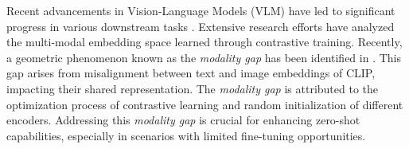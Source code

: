 Recent advancements \cite{clip,align,glip,blip,glip2} in Vision-Language Models (VLM) have led to significant progress in various downstream tasks \cite{styleclip,maskclip,pointclip,denclip,calip,hoiclip}. Extensive research efforts \cite{Wang2020UnderstandingCR,Wang2020UnderstandingTB,clipbagofwords,MindGap} have analyzed the multi-modal embedding space learned through contrastive training. Recently, a geometric phenomenon known as the \textit{modality gap} has been identified in \cite{MindGap}. This gap arises from misalignment between text and image embeddings of CLIP, impacting their shared representation. The \textit{modality gap} is attributed to the optimization process of contrastive learning and random initialization of different encoders. Addressing this \textit{modality gap} is crucial for enhancing zero-shot capabilities, especially in scenarios with limited fine-tuning opportunities.
